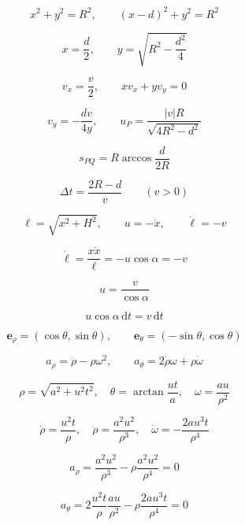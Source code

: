 \documentclass[12pt]{article}
\begin{document}
\[
x^2+y^2=R^2,\qquad(x-d)^2+y^2=R^2
\]

\[
x=\frac d2,\qquad y=\sqrt{R^2-\frac{d^2}4}
\]

\[
v_x=\frac v2,\qquad xv_x+yv_y=0
\]

\[
v_y=-\frac{dv}{4y},\qquad \boxed{u_P=\frac{|v|R}{\sqrt{4R^2-d^2}}}
\]

\[
s_{PQ}=R\arccos\frac d{2R}
\]

\[
\Delta t=\frac{2R-d}{v}\qquad(v>0)
\]

\[
\ell=\sqrt{x^2+H^2},\qquad u=-\dot x,\qquad \dot\ell=-v
\]

\[
\dot\ell=\frac{x\dot x}{\ell} =-u\cos\alpha=-v
\]

\[
\boxed{u=\frac v{\cos\alpha}}
\]

\[
u\cos\alpha\,\mathrm dt=v\,\mathrm dt
\]

\[
\boldsymbol e_\rho=(\cos\theta,\sin\theta),\qquad \boldsymbol e_\theta=(-\sin\theta,\cos\theta)
\]

\[
\boxed{a_\rho=\ddot\rho-\rho\omega^2},\qquad \boxed{a_\theta=2\dot\rho\omega+\rho\dot\omega}
\]

\[
\rho=\sqrt{a^2+u^2t^2},\quad \theta=\arctan\frac{ut}{a},\quad\omega=\frac{au}{\rho^2}
\]

\[
\dot\rho=\frac{u^2t}{\rho},\quad \ddot\rho=\frac{a^2u^2}{\rho^3},\quad \dot\omega=-\frac{2au^3t}{\rho^4}
\]

\[
a_\rho=\frac{a^2u^2}{\rho^3} -\rho\frac{a^2u^2}{\rho^4}=0
\]

\[
a_\theta=2\frac{u^2t}{\rho}\frac{au}{\rho^2} -\rho\frac{2au^3t}{\rho^4}=0
\]
\end{document}
